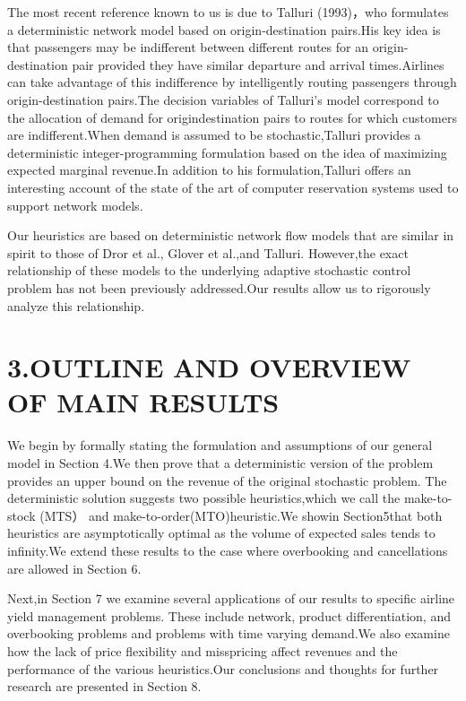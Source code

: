 The most recent reference known to us is due to Talluri (1993)，who
formulates a deterministic network model based on origin-destination
pairs.His key idea is that passengers may be indifferent between
different routes for an origin-destination pair provided they have
similar departure and arrival times.Airlines can take advantage of this
indifference by intelligently routing passengers through
origin-destination pairs.The decision variables of Talluri's model
correspond to the allocation of demand for origindestination pairs to
routes for which customers are indifferent.When demand is assumed to be
stochastic,Talluri provides a deterministic integer-programming
formulation based on the idea of maximizing expected marginal revenue.In
addition to his formulation,Talluri offers an interesting account of the
state of the art of computer reservation systems used to support network
models.

Our heuristics are based on deterministic network flow models that are
similar in spirit to those of Dror et al., Glover et al.,and Talluri.
However,the exact relationship of these models to the underlying
adaptive stochastic control problem has not been previously
addressed.Our results allow us to rigorously analyze this relationship.

\section{3.OUTLINE AND OVERVIEW OF MAIN
RESULTS}\label{outline-and-overview-of-main-results}

We begin by formally stating the formulation and assumptions of our
general model in Section 4.We then prove that a deterministic version of
the problem provides an upper bound on the revenue of the original
stochastic problem. The deterministic solution suggests two possible
heuristics,which we call the make-to-stock (MTS） and
make-to-order(MTO)heuristic.We showin Section5that both heuristics are
asymptotically optimal as the volume of expected sales tends to
infinity.We extend these results to the case where overbooking and
cancellations are allowed in Section 6.

Next,in Section 7 we examine several applications of our results to
specific airline yield management problems. These include network,
product differentiation, and overbooking problems and problems with time
varying demand.We also examine how the lack of price flexibility and
misspricing affect revenues and the performance of the various
heuristics.Our conclusions and thoughts for further research are
presented in Section 8.


